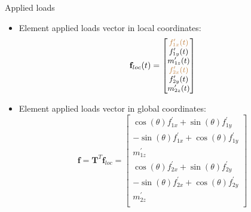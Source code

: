 \documentclass[aspectratio=169]{beamer}
\begin{document}
\begin{frame}{Applied loads}
  \begin{itemize}
    \item Element applied loads vector in local coordinates:
          \[ \small \mathbf{f}_{loc}(t) = \begin{bmatrix} {\color{brown}f_{1x}^\prime(t)} \\ f_{1y}^\prime(t) \\ m_{1z}^\prime(t) \\{\color{brown}f_{2x}^\prime(t)} \\f_{2y}^\prime(t) \\ m_{2z}^\prime(t) \end{bmatrix} \]
    \item Element applied loads vector in global coordinates:
          \[
            \mathbf{f} = \mathbf T^T \mathbf{f}_{loc} =\begin{bmatrix}
              \cos(\theta)f_{1x}^\prime + \sin(\theta)f_{1y}^\prime \\
              -\sin(\theta)f_{1x}^\prime +\cos(\theta)f_{1y}^\prime \\
              m_{1z}^\prime                                         \\
              \cos(\theta)f_{2x}^\prime + \sin(\theta)f_{2y}^\prime \\
              -\sin(\theta)f_{2x}^\prime +\cos(\theta)f_{2y}^\prime \\
              m_{2z}^\prime                                         \\
            \end{bmatrix}
          \]
  \end{itemize}
\end{frame}
\end{document}

